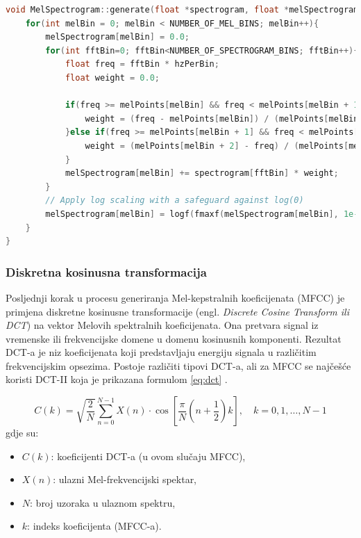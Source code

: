 \newpage

\begin{lstlisting}[language=C++, caption=Generiranje Melovog spektrograma, label=code:mel]
void MelSpectrogram::generate(float *spectrogram, float *melSpectrogram){
    for(int melBin = 0; melBin < NUMBER_OF_MEL_BINS; melBin++){
        melSpectrogram[melBin] = 0.0;
        for(int fftBin=0; fftBin<NUMBER_OF_SPECTROGRAM_BINS; fftBin++){
            float freq = fftBin * hzPerBin;
            float weight = 0.0;

            if(freq >= melPoints[melBin] && freq < melPoints[melBin + 1]){
                weight = (freq - melPoints[melBin]) / (melPoints[melBin + 1] - melPoints[melBin]);
            }else if(freq >= melPoints[melBin + 1] && freq < melPoints[melBin + 2]){
                weight = (melPoints[melBin + 2] - freq) / (melPoints[melBin + 2] - melPoints[melBin + 1]);
            }
            melSpectrogram[melBin] += spectrogram[fftBin] * weight;
        }
        // Apply log scaling with a safeguard against log(0)
        melSpectrogram[melBin] = logf(fmaxf(melSpectrogram[melBin], 1e-6));
    }
}
\end{lstlisting}

\subsubsection{Diskretna kosinusna transformacija}

Posljednji korak u procesu generiranja Mel-kepstralnih koeficijenata (MFCC) je primjena diskretne
kosinusne transformacije (engl. \textit{Discrete Cosine Transform ili DCT}) na vektor Melovih spektralnih
koeficijenata. Ona pretvara signal iz vremenske ili frekvencijske domene u 
domenu kosinusnih komponenti. Rezultat DCT-a je niz koeficijenata koji predstavljaju energiju 
signala u različitim frekvencijskim opsezima. 
Postoje različiti tipovi DCT-a, ali za MFCC se najčešće koristi DCT-II koja je prikazana
formulom \eqref{eq:dct} .

\begin{equation}
    \label{eq:dct}
    C(k) = \sqrt{\frac{2}{N}} \sum_{n=0}^{N-1} X(n) \cdot \cos\left[ \frac{\pi}{N} \left(n + \frac{1}{2}\right) k \right], \quad k = 0, 1, \dots, N-1
\end{equation}
gdje su:
\begin{itemize}
\item $C(k)$: koeficijenti DCT-a (u ovom slučaju MFCC),
\item $X(n)$: ulazni Mel-frekvencijski spektar,
\item $N$: broj uzoraka u ulaznom spektru,
\item $k$: indeks koeficijenta (MFCC-a).
\end{itemize}

